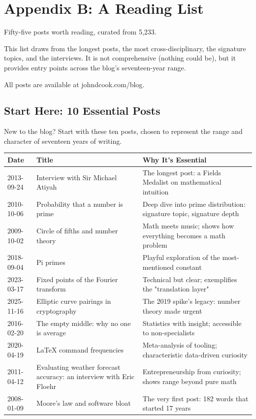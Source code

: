 \chapter{Appendix B: A Reading List}

Fifty-five posts worth reading, curated from 5,233.

This list draws from the longest posts, the most cross-disciplinary, the signature topics, and the interviews. It is not comprehensive (nothing could be), but it provides entry points across the blog's seventeen-year range.

All posts are available at johndcook.com/blog.

\bigskip

\section*{Start Here: 10 Essential Posts}

New to the blog? Start with these ten posts, chosen to represent the range and character of seventeen years of writing.

\begin{longtable}{l p{4cm} p{3.5cm}}
\toprule
\textbf{Date} & \textbf{Title} & \textbf{Why It's Essential} \tabularnewline
\midrule
2013-09-24 & Interview with Sir Michael Atiyah & The longest post: a Fields Medalist on mathematical intuition \tabularnewline
2010-10-06 & Probability that a number is prime & Deep dive into prime distribution: signature topic, signature depth \tabularnewline
2009-10-02 & Circle of fifths and number theory & Math meets music; shows how everything becomes a math problem \tabularnewline
2018-09-04 & Pi primes & Playful exploration of the most-mentioned constant \tabularnewline
2023-03-17 & Fixed points of the Fourier transform & Technical but clear; exemplifies the "translation layer" \tabularnewline
2025-11-16 & Elliptic curve pairings in cryptography & The 2019 spike's legacy: number theory made urgent \tabularnewline
2016-02-20 & The empty middle: why no one is average & Statistics with insight; accessible to non-specialists \tabularnewline
2020-04-19 & LaTeX command frequencies & Meta-analysis of tooling; characteristic data-driven curiosity \tabularnewline
2011-04-12 & Evaluating weather forecast accuracy: an interview with Eric Floehr & Entrepreneurship from curiosity; shows range beyond pure math \tabularnewline
2008-01-09 & Moore's law and software bloat & The very first post: 182 words that started 17 years \tabularnewline
\bottomrule
\end{longtable}

